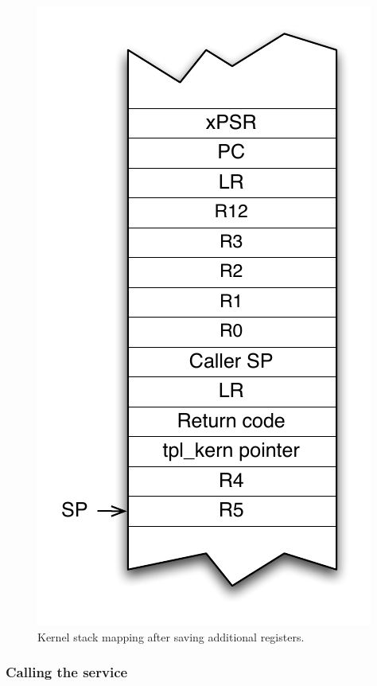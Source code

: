 \begin{figure}[htbp] %
\begin{minipage}{0.5\textwidth}
    \centering
  \includegraphics[scale=.6]{pictures/CM4KernelStackSaveDone} 
\end{minipage}
\begin{minipage}{0.5\textwidth}
   \caption{Kernel stack mapping after saving additional registers.}\label{fig:CM4KernelStackSaveDone}
\end{minipage}
\end{figure}

\subsubsection{Calling the service}

